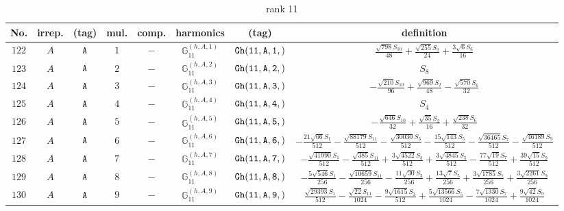 \documentclass[fleqn,8pt]{jsarticle}
\begin{document}
\begin{table}[ht!]
\begin{center}
\caption{rank 11}
\renewcommand{\arraystretch}{1.3}
\begin{tabular}{cccccccc} \hline \hline
No. & irrep. & (tag) & mul. & comp. & harmonics & (tag) & definition \\ \hline
$ 122 $ & $ A $ & $ {\tt A} $ & $ 1 $ & $ - $ & $ \mathbb{G}_{11}^{(h,A,1)} $ & $ {\tt Gh(11,A,1,)} $ & $ \frac{\sqrt{798} S_{10}}{48} + \frac{\sqrt{255} S_{2}}{24} + \frac{3 \sqrt{6} S_{6}}{16} $ \\
$ 123 $ & $ A $ & $ {\tt A} $ & $ 2 $ & $ - $ & $ \mathbb{G}_{11}^{(h,A,2)} $ & $ {\tt Gh(11,A,2,)} $ & $ S_{8} $ \\
$ 124 $ & $ A $ & $ {\tt A} $ & $ 3 $ & $ - $ & $ \mathbb{G}_{11}^{(h,A,3)} $ & $ {\tt Gh(11,A,3,)} $ & $ - \frac{\sqrt{210} S_{10}}{96} + \frac{\sqrt{969} S_{2}}{48} - \frac{\sqrt{570} S_{6}}{32} $ \\
$ 125 $ & $ A $ & $ {\tt A} $ & $ 4 $ & $ - $ & $ \mathbb{G}_{11}^{(h,A,4)} $ & $ {\tt Gh(11,A,4,)} $ & $ S_{4} $ \\
$ 126 $ & $ A $ & $ {\tt A} $ & $ 5 $ & $ - $ & $ \mathbb{G}_{11}^{(h,A,5)} $ & $ {\tt Gh(11,A,5,)} $ & $ - \frac{\sqrt{646} S_{10}}{32} + \frac{\sqrt{35} S_{2}}{16} + \frac{\sqrt{238} S_{6}}{32} $ \\
$ 127 $ & $ A $ & $ {\tt A} $ & $ 6 $ & $ - $ & $ \mathbb{G}_{11}^{(h,A,6)} $ & $ {\tt Gh(11,A,6,)} $ & $ - \frac{21 \sqrt{66} S_{1}}{512} - \frac{\sqrt{88179} S_{11}}{512} - \frac{\sqrt{30030} S_{3}}{512} - \frac{15 \sqrt{143} S_{5}}{512} - \frac{\sqrt{36465} S_{7}}{512} - \frac{\sqrt{46189} S_{9}}{512} $ \\
$ 128 $ & $ A $ & $ {\tt A} $ & $ 7 $ & $ - $ & $ \mathbb{G}_{11}^{(h,A,7)} $ & $ {\tt Gh(11,A,7,)} $ & $ - \frac{\sqrt{41990} S_{1}}{512} - \frac{\sqrt{385} S_{11}}{512} + \frac{3 \sqrt{4522} S_{3}}{512} + \frac{3 \sqrt{4845} S_{5}}{512} - \frac{77 \sqrt{19} S_{7}}{512} + \frac{39 \sqrt{15} S_{9}}{512} $ \\
$ 129 $ & $ A $ & $ {\tt A} $ & $ 8 $ & $ - $ & $ \mathbb{G}_{11}^{(h,A,8)} $ & $ {\tt Gh(11,A,8,)} $ & $ - \frac{5 \sqrt{546} S_{1}}{256} - \frac{\sqrt{10659} S_{11}}{256} - \frac{11 \sqrt{30} S_{3}}{256} + \frac{13 \sqrt{7} S_{5}}{256} + \frac{3 \sqrt{1785} S_{7}}{256} + \frac{3 \sqrt{2261} S_{9}}{256} $ \\
$ 130 $ & $ A $ & $ {\tt A} $ & $ 9 $ & $ - $ & $ \mathbb{G}_{11}^{(h,A,9)} $ & $ {\tt Gh(11,A,9,)} $ & $ \frac{\sqrt{29393} S_{1}}{512} - \frac{\sqrt{22} S_{11}}{1024} - \frac{9 \sqrt{1615} S_{3}}{512} + \frac{5 \sqrt{13566} S_{5}}{1024} - \frac{7 \sqrt{1330} S_{7}}{1024} + \frac{9 \sqrt{42} S_{9}}{1024} $ \\

\end{tabular}
\end{center}
\end{table}
\end{document}
